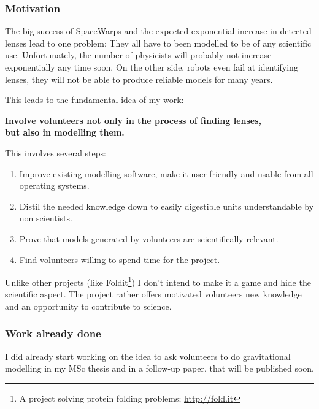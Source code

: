 \documentclass[11pt]{article}
\begin{document}
\subsubsection{Motivation}

The big success of SpaceWarps and the expected exponential increase in detected lenses lead to one problem:
They all have to been modelled to be of any scientific use.
Unfortunately, the number of physicists will probably not increase exponentially any time soon.
On the other side, robots even fail at identifying lenses, they will not be able to produce reliable models for many years.

This leads to the fundamental idea of my work:

{\bf Involve volunteers not only in the process of finding lenses,\\but also in modelling them.}

This involves several steps:

\begin{enumerate}
  \item Improve existing modelling software, make it user friendly and usable from all operating systems.
  \item Distil the needed knowledge down to easily digestible units understandable by non scientists.
  \item Prove that models generated by volunteers are scientifically relevant.
  \item Find volunteers willing to spend time for the project.
\end{enumerate}

Unlike other projects (like Foldit\footnote{A project solving protein folding problems; \url{http://fold.it}}) I don't intend to make it a game and hide the scientific aspect.
The project rather offers motivated volunteers new knowledge and an opportunity to contribute to science.


\subsubsection{Work already done}

I did already start working on the idea to ask volunteers to do gravitational modelling in my MSc thesis and in a follow-up paper, that will be published soon.
\end{document}
